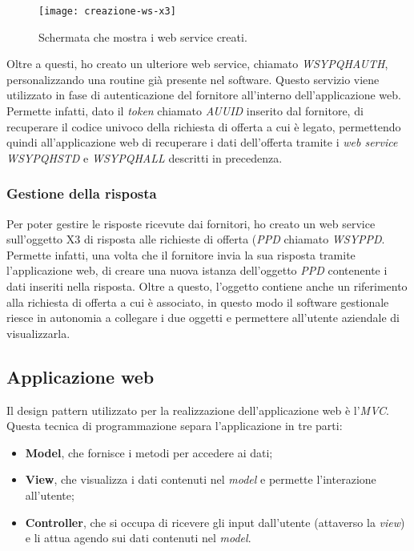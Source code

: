\begin{figure}[htbp]
	\begin{center}
		\texttt{[image: creazione-ws-x3]}
		\caption{Schermata che mostra i web service creati.}
	\end{center}
\end{figure}

Oltre a questi, ho creato un ulteriore web service, chiamato \textit{WSYPQHAUTH}, personalizzando una routine già presente nel software. 
Questo servizio viene utilizzato in fase di autenticazione del fornitore all'interno dell'applicazione web. 
Permette infatti, dato il \textit{token} chiamato \textit{AUUID} inserito dal fornitore, di recuperare il codice univoco della richiesta di offerta a cui è legato, permettendo quindi all'applicazione web di recuperare i dati dell'offerta tramite i \textit{web service} \textit{WSYPQHSTD} e \textit{WSYPQHALL} descritti in precedenza.

\subsubsection{Gestione della risposta}
Per poter gestire le risposte ricevute dai fornitori, ho creato un web service sull'oggetto X3 di risposta alle richieste di offerta (\textit{PPD} chiamato \textit{WSYPPD}.
Permette infatti, una volta che il fornitore invia la sua risposta tramite l'applicazione web, di creare una nuova istanza dell'oggetto \textit{PPD} contenente i dati inseriti nella risposta. Oltre a questo, l'oggetto contiene anche un riferimento alla richiesta di offerta a cui è associato, in questo modo il software gestionale riesce in autonomia a collegare i due oggetti e permettere all'utente aziendale di visualizzarla. 


\subsection{Applicazione web}
Il design pattern utilizzato per la realizzazione dell'applicazione web è l'\textit{MVC}.
Questa tecnica di programmazione separa l'applicazione in tre parti:
\begin{itemize}
	\item \textbf{Model}, che fornisce i metodi per accedere ai dati;
	\item \textbf{View}, che visualizza i dati contenuti nel \textit{model} e permette l'interazione all'utente;
	\item \textbf{Controller}, che si occupa di ricevere gli input dall'utente (attaverso la \textit{view}) e li attua agendo sui dati contenuti nel \textit{model}.
\end{itemize}

